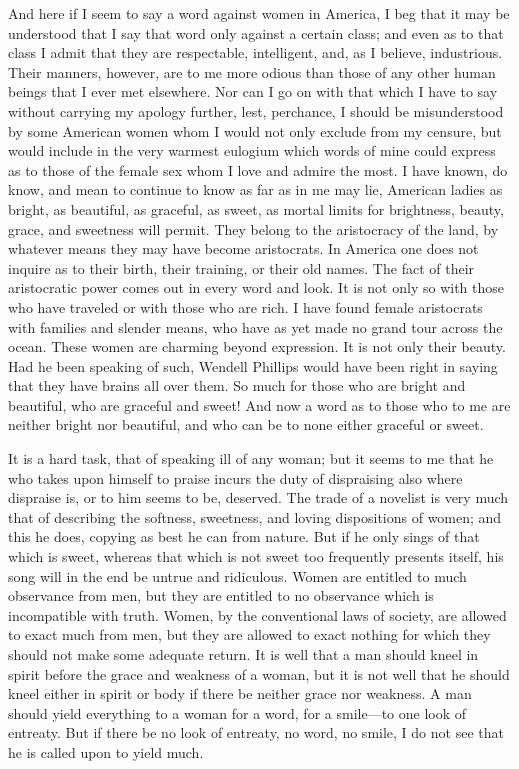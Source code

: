 And here if I seem to say a word against women in America, I beg
that it may be understood that I say that word only against a
certain class; and even as to that class I admit that they are
respectable, intelligent, and, as I believe, industrious.  Their
manners, however, are to me more odious than those of any other
human beings that I ever met elsewhere.  Nor can I go on with that
which I have to say without carrying my apology further, lest,
perchance, I should be misunderstood by some American women whom I
would not only exclude from my censure, but would include in the
very warmest eulogium which words of mine could express as to those
of the female sex whom I love and admire the most.  I have known,
do know, and mean to continue to know as far as in me may lie,
American ladies as bright, as beautiful, as graceful, as sweet, as
mortal limits for brightness, beauty, grace, and sweetness will
permit.  They belong to the aristocracy of the land, by whatever
means they may have become aristocrats.  In America one does not
inquire as to their birth, their training, or their old names.  The
fact of their aristocratic power comes out in every word and look.
It is not only so with those who have traveled or with those who
are rich.  I have found female aristocrats with families and
slender means, who have as yet made no grand tour across the ocean.
These women are charming beyond expression.  It is not only their
beauty.  Had he been speaking of such, Wendell Phillips would have
been right in saying that they have brains all over them.  So much
for those who are bright and beautiful, who are graceful and sweet!
And now a word as to those who to me are neither bright nor
beautiful, and who can be to none either graceful or sweet.

It is a hard task, that of speaking ill of any woman; but it seems
to me that he who takes upon himself to praise incurs the duty of
dispraising also where dispraise is, or to him seems to be,
deserved.  The trade of a novelist is very much that of describing
the softness, sweetness, and loving dispositions of women; and this
he does, copying as best he can from nature.  But if he only sings
of that which is sweet, whereas that which is not sweet too
frequently presents itself, his song will in the end be untrue and
ridiculous.  Women are entitled to much observance from men, but
they are entitled to no observance which is incompatible with
truth.  Women, by the conventional laws of society, are allowed to
exact much from men, but they are allowed to exact nothing for
which they should not make some adequate return.  It is well that a
man should kneel in spirit before the grace and weakness of a
woman, but it is not well that he should kneel either in spirit or
body if there be neither grace nor weakness.  A man should yield
everything to a woman for a word, for a smile---to one look of
entreaty.  But if there be no look of entreaty, no word, no smile,
I do not see that he is called upon to yield much.

